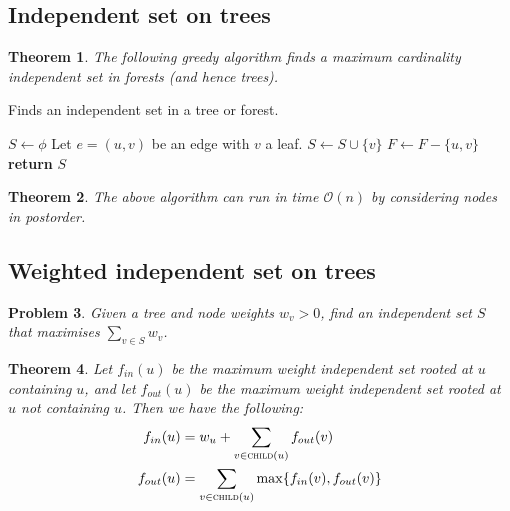 \documentclass[10pt, oneside, reqno]{amsart}
\theoremstyle{plain}%
\newtheorem{thm}{Theorem}[section]
\newtheorem{prob}[thm]{Problem}
\theoremstyle{definition}
\theoremstyle{remark}
\newcommand{\bigo}[1]{\mathcal{O}(#1)}
\begin{document}
\subsection{Independent set on trees} %
\label{sub:independent_set_on_trees}

\begin{thm}
	The following greedy algorithm finds a maximum cardinality independent set in forests (and hence trees).
\end{thm}

\begin{algorithm}[H]
	\label{alg:Vecter Cover}
	\caption{Finds an independent set in a tree or forest.}
	\begin{algorithmic}[1]
			\State $S \gets \phi$
				\State Let $e = (u,v)$ be an edge with $v$ a leaf.
				\State $S \gets S \cup \{ v\}$
				\State $F \gets F - \{ u, v \}$
			\EndWhile
		\State \textbf{return} $S$
		\EndProcedure
	\end{algorithmic}
\end{algorithm}

\begin{thm}
	The above algorithm can run in time $\bigo{n}$ by considering nodes in postorder.
\end{thm}

\subsection{Weighted independent set on trees} %
\label{sub:weighted_independent_set_on_trees}
\begin{prob}
	Given a tree and node weights $w_v > 0$, find an independent set $S$ that maximises $\sum_{v \in S} w_v$.
\end{prob}

\begin{thm}
	Let $f_{in}(u)$ be the maximum weight independent set rooted at $u$ containing $u$, and let $f_{out}(u)$ be the maximum weight independent set rooted at $u$ not containing $u$.  Then we have the following:
	\begin{align*}
		f_{in}(u) &= w_u + \sum_{v \in \textsc{child}(u)} f_{out}(v) \\
		f_{out}(u) &= \sum_{v \in \textsc{child}(u)} \max \{f_{in}(v), f_{out}(v)\}		
	\end{align*}
\end{thm}
\end{document}
